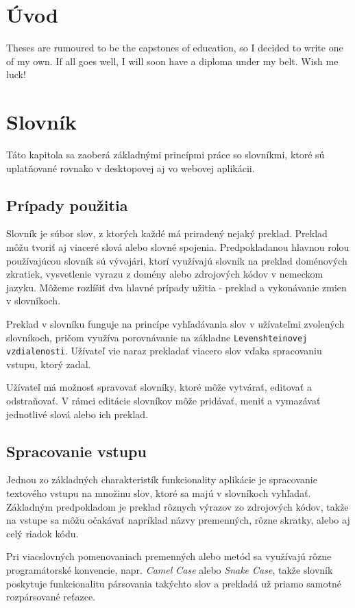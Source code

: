 \documentclass[
  digital, %
  table,   %
  lof,     %
  lot,     %
]{fithesis3}
\begin{document}
\chapter{Úvod}
Theses are rumoured to be the capstones of education, so I decided
to write one of my own. If all goes well, I will soon have a
diploma under my belt. Wish me luck!

\chapter{Slovník}
Táto kapitola sa zaoberá základnými princípmi práce so slovníkmi, ktoré sú uplatňované rovnako v desktopovej aj vo webovej aplikácii.

\section{Prípady použitia}
Slovník je súbor slov, z ktorých každé má priradený nejaký preklad. Preklad môžu tvoriť aj viaceré slová alebo slovné spojenia. Predpokladanou hlavnou rolou používajúcou slovník sú vývojári, ktorí využívajú slovník na preklad doménových zkratiek, vysvetlenie vyrazu z domény alebo zdrojových kódov v nemeckom jazyku. Môžeme rozlíšiť dva hlavné prípady užitia - preklad a vykonávanie zmien v slovníkoch.

Preklad v slovníku funguje na princípe vyhľadávania slov v užívateľmi zvolených slovníkoch, pričom využíva porovnávanie na základne \texttt{Levenshteinovej vzdialenosti}. Užívateľ vie naraz prekladať viacero slov vďaka spracovaniu vstupu, ktorý zadal.

Užívateľ má možnosť spravovať slovníky, ktoré môže vytvárať, editovať a odstraňovať. V rámci editácie slovníkov môže pridávať, meniť a vymazávať jednotlivé slová alebo ich preklad.

\section{Spracovanie vstupu}
Jednou zo základných charakteristík funkcionality aplikácie je spracovanie textového vstupu na množinu slov, ktoré sa majú v slovníkoch vyhľadať. Základným predpokladom je preklad rôznych výrazov zo zdrojových kódov, takže na vstupe sa môžu očakávať napríklad názvy premenných, rôzne skratky, alebo aj celý riadok kódu.

Pri viacslovných pomenovaniach premenných alebo metód sa využívajú rôzne programátorské konvencie, napr. \textit{Camel Case} alebo \textit{Snake Case}, takže slovník poskytuje funkcionalitu pársovania takýchto slov a prekladá už priamo samotné rozpársované reťazce.
\end{document}
